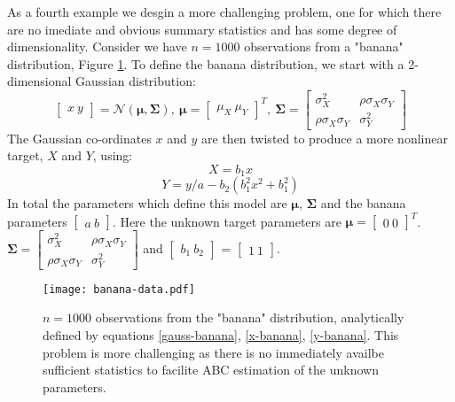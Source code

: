 As a fourth example we desgin a more challenging problem, one for which there are no imediate and obvious summary statistics and has some degree of dimensionality. Consider we have $n = 1000$ observations from a "banana" distribution, Figure \ref{banana-data}. To define the banana distribution, we start with a 2-dimensional Gaussian distribution:
\begin{equation}
\begin{bmatrix}
x\ y
\end{bmatrix}=\mathcal{N}(\bm{\mu},\bm{\Sigma}),\ \bm{\mu} = \begin{bmatrix}
\mu_X\ \mu_Y
\end{bmatrix}^T,\ \bm{\Sigma} = \begin{bmatrix}
\sigma^2_X & \rho\sigma_X\sigma_Y\\
\rho\sigma_X\sigma_Y & \sigma^2_Y
\end{bmatrix} 
\label{gauss-banana}
\end{equation}
The Gaussian co-ordinates $x$ and $y$ are then twisted to produce a more nonlinear target, $X$ and $Y$, using:
\begin{equation}
X = b_1x
\label{x-banana}
\end{equation}
\begin{equation}
Y = y/a-b_2(b_1^2x^2+b_1^2)
\label{y-banana}
\end{equation}
In total the parameters which define this model are $\bm{\mu}$, $\bm{\Sigma}$ and the banana parameters $\begin{bmatrix}
a\ b
\end{bmatrix}$. Here the unknown target parameters are $\bm{\mu} = \begin{bmatrix}
0\ 0
\end{bmatrix}^T$.
$\bm{\Sigma} = \begin{bmatrix}
\sigma^2_X & \rho\sigma_X\sigma_Y\\
\rho\sigma_X\sigma_Y & \sigma^2_Y
\end{bmatrix}$ and $\begin{bmatrix}
b_1\ b_2
\end{bmatrix}$ = $\begin{bmatrix}
1\ 1
\end{bmatrix}$. 

\begin{figure}[H]
\centering
\texttt{[image: banana-data.pdf]}
\caption{$n = 1000$ observations from the "banana" distribution, analytically defined by equations \ref{gauss-banana}, \ref{x-banana}, \ref{y-banana}. 
This problem is more challenging as there is no immediately availbe sufficient statistics to facilite ABC estimation of the unknown parameters.}
\label{banana-data}
\end{figure}

